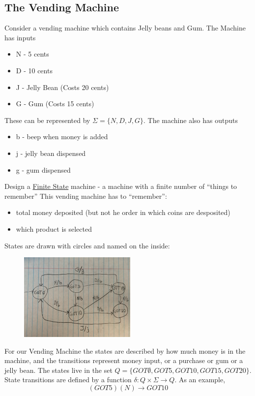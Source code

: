 \documentclass{scrartcl}
\begin{document}
\subsection{The Vending Machine}
Consider a vending machine which contains Jelly beans and Gum. The Machine has inputs
\begin{itemize}
\item N - 5 cents
\item D - 10 cents
\item J - Jelly Bean (Costs 20 cents)
\item G - Gum (Costs 15 cents)
\end{itemize}\pagebreak
These can be represented by $\Sigma=\{N,D,J,G\}$. The machine also has outputs
\begin{itemize}
\item b - beep when money is added
\item j - jelly bean dispensed
\item g - gum dispensed
\end{itemize}
Design a \underline{Finite State} machine - a machine with a finite number of ``things to remember''
This vending machine has to ``remember'':
\begin{itemize}
\item total money deposited (but not he order in which coins are desposited)
\item which product is selected
\end{itemize}
States are drawn with circles and named on the inside:\\

\begin{figure}
\includegraphics{./VMStateDiagram.png}\\
\end{figure}

For our Vending Machine the states are described by how much money is in the machine, and the transitions represent money input, or a purchase or gum or a jelly bean. The states live in the set $Q=\{GOT\emptyset,GOT5,GOT10,GOT15,GOT20\}$. State transitions are defined by a function $\delta: Q\times\Sigma\rightarrow Q$. As an example, 
\begin{displaymath}
(GOT5)(N) \rightarrow GOT10 
\end{displaymath}
\end{document}
